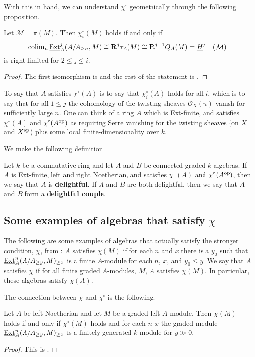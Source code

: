 \documentclass[reqno, 12pt]{amsart}
\begin{document}
With this in hand, we can understand $\chi^\circ$ geometrically through the following proposition.
\begin{proposition}
  Let $\mathcal{M} = \pi(M)$.
  Then $\chi_i^\circ(M)$ holds if and only if
  $$\operatorname{colim}_n \underline{\operatorname{Ext}}^j_A(A/A_{\geq n}, M) \cong \mathbf{R}^j\tau_A(M) \cong \mathbf{R}^{j-1}Q_A (M) = \underline{H}^{j-1}(\mathcal{M})$$
  is right limited for $2 \leq j \leq i$.
\end{proposition}
\begin{proof}
  The first isomorphism is \cite[Lem. 4.1.2]{VdB} and the rest of the statement is \cite[Cor. 3.6 (3)]{AZ}.
\end{proof}
To say that $A$ satisfies $\chi^\circ(A)$ is to say that $\chi_i^\circ(A)$ holds for all $i$, which is to say that for all $1 \leq j$ the cohomology of the twisting sheaves $\mathcal{O}_X(n)$ vanish for sufficiently large $n$.
One can think of a ring $A$ which is Ext-finite, and satisfies $\chi^\circ(A)$ and $\chi^\circ(A^{\operatorname{op}})$ as requiring Serre vanishing for the twisting sheaves (on $X$ and $X^{\operatorname{op}}$) plus some local finite-dimensionality over $k$.

We make the following definition
\begin{definition}
  Let $k$ be a commutative ring and let $A$ and $B$ be connected graded $k$-algebras.
  If $A$ is Ext-finite, left and right Noetherian, and satisfies $\chi^\circ(A)$ and $\chi^\circ(A^{\operatorname{op}})$, then we say that $A$ is \textbf{delightful}.
  If $A$ and $B$ are both delightful, then we say that $A$ and $B$ form a \textbf{delightful couple}.
\end{definition}

\subsection{Some examples of algebras that satisfy $\chi$}
The following are some examples of algebras that actually satisfy the stronger condition, $\chi$, from \cite{AZ}:
$A$ satisfies $\chi(M)$ if for each $n$ and $x$ there is a $y_0$ such that $\underline{\operatorname{Ext}}^n_A(A/A_{\geq y},M)_{\geq x}$ is a finite $A$-module for each $n$, $x$, and $y_0 \leq y$.
We say that $A$ satisfies $\chi$ if for all finite graded $A$-modules, $M$, $A$ satisfies $\chi(M)$.
In particular, these algebras satisfy $\chi(A)$.

The connection between $\chi$ and $\chi^\circ$ is the following.

\begin{proposition}
  Let $A$ be left Noetherian and let $M$ be a graded left $A$-module. Then $\chi(M)$ holds if and only if $\chi^\circ(M)$ holds and for each $n,x$ the graded module $\underline{\operatorname{Ext}}_A^n(A/A_{\geq y},M)_{\geq x}$ is a finitely generated $k$-module for $y \gg 0$.
\end{proposition}
\begin{proof}
  This is \cite[Prop 3.8 (1)]{AZ}.
\end{proof}
\end{document}
